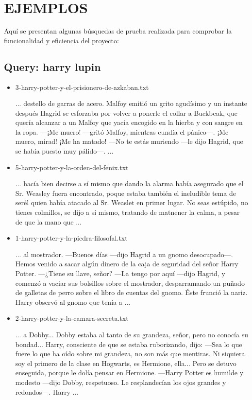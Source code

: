 \documentclass[a4paper,12pt,]{article}
\begin{document}
\section*{EJEMPLOS}
Aquí se presentan algunas búsquedas de prueba realizada para comprobar la funcionalidad y eficiencia del proyecto:

\subsection*{Query: harry lupin}
\begin{itemize}
    \item 3-harry-potter-y-el-prisionero-de-azkaban.txt
   
    ... destello de garras de acero. Malfoy emitió un grito agudísimo y un instante después Hagrid se esforzaba 
    por volver a ponerle el collar a Buckbeak, que quería alcanzar a un Malfoy que yacía encogido en la hierba y 
    con sangre en la ropa. —¡Me muero! —gritó Malfoy, mientras cundía el pánico—. ¡Me muero, mirad! ¡Me ha matado! 
    —No te estás muriendo —le dijo Hagrid, que se había puesto muy pálido—. ...

    \item 5-harry-potter-y-la-orden-del-fenix.txt
    
    ...  hacía bien decirse a sí mismo que dando la alarma había asegurado que el Sr. Weasley fuera encontrado, 
    poque estaba también el ineludible tema de serél quien había atacado al Sr. Weaslet en primer lugar. No seas 
    estúpido, no tienes colmillos, se dijo a sí mismo, tratando de matnener la calma, a pesar de que la mano que  
    ...

    \item 1-harry-potter-y-la-piedra-filosofal.txt
    
    ... al mostrador. —Buenos días —dijo Hagrid a un gnomo desocupado—. Hemos venido a sacar algún dinero de la 
    caja de seguridad del señor Harry Potter. —¿Tiene su llave, señor? —La tengo por aquí —dijo Hagrid, y comenzó 
    a vaciar sus bolsillos sobre el mostrador, desparramando un puñado de galletas de perro sobre el libro de 
    cuentas del gnomo. Éste frunció la nariz. Harry observó al gnomo que tenía a ...

    \item 2-harry-potter-y-la-camara-secreta.txt
    
    ... a Dobby... Dobby estaba al tanto de su grandeza, señor, pero no conocía su bondad... Harry, consciente de 
    que se estaba ruborizando, dijo: —Sea lo que fuere lo que ha oído sobre mi grandeza, no son más que mentiras. 
    Ni siquiera soy el primero de la clase en Hogwarts, es Hermione, ella... Pero se detuvo enseguida, porque le 
    dolía pensar en Hermione. —Harry Potter es humilde y modesto —dijo Dobby, respetuoso. Le resplandecían los ojos 
    grandes y redondos—. Harry ...


\end{itemize}
\end{document}
